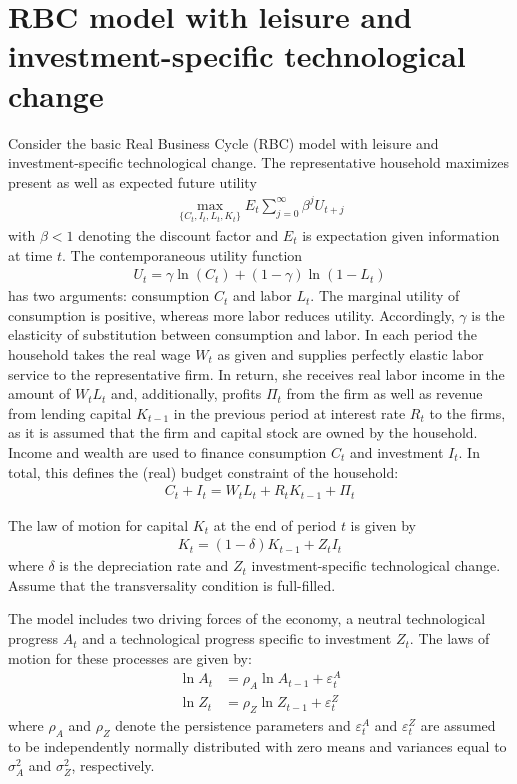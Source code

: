 \documentclass[a4paper]{scrartcl}
\begin{document}
\section{RBC model with leisure and investment-specific technological change}
Consider the basic Real Business Cycle (RBC) model with leisure and investment-specific technological change. The representative household maximizes present as well as expected future utility
\begin{align*}
\underset{\{C_{t},I_{t},L_t,K_{t}\}}{\max} E_t \sum_{j=0}^{\infty} \beta^{j} U_{t+j}
\end{align*}
with $\beta <1$ denoting the discount factor and $E_t$ is expectation given information at time $t$. The contemporaneous utility function 
\begin{align*}
U_t = \gamma \ln(C_t) + (1-\gamma) \ln{(1-L_t)}
\end{align*}
has two arguments: consumption $C_t$ and labor $L_t$. The marginal utility of consumption is positive, whereas more labor reduces utility. Accordingly, $\gamma$ is the elasticity of substitution between consumption and labor. In each period the household takes the real wage $W_t$ as given and supplies perfectly elastic labor service to the representative firm. In return, she receives real labor income in the amount of $W_t L_t$ and, additionally, profits $\Pi_t$ from the firm as well as revenue from lending capital $K_{t-1}$ in the previous period at interest rate $R_t$ to the firms, as it is assumed that the firm and capital stock are owned by the household. Income and wealth are used to finance consumption $C_t$ and investment $I_t$. In total, this defines the (real) budget constraint of the household:
\begin{align*}
C_t + I_t = W_t L_t + R_t K_{t-1} + \Pi_t
\end{align*}

The law of motion for capital $K_t$ at the end of period $t$ is given by
\begin{align*}
K_{t} = (1-\delta)K_{t-1} + Z_t I_t
\end{align*}
where $\delta$ is the depreciation rate and $Z_t$ investment-specific technological change. Assume that the transversality condition is full-filled.

The model includes two driving forces of the economy, a neutral technological progress $A_t$ and a technological progress specific to investment $Z_t$. The laws of motion for these processes are given by:
\begin{align*}
\ln{A_{t}} &= \rho_A \ln{A_{t-1}}  + \varepsilon_t^A\\
\ln{Z_{t}} &= \rho_Z \ln{Z_{t-1}}  + \varepsilon_t^Z
\end{align*}
where $\rho_A$ and $\rho_Z$ denote the persistence parameters and $\varepsilon_t^A$ and $\varepsilon_t^Z$ are assumed to be independently normally distributed with zero means and variances equal to $\sigma_A^2$ and $\sigma_Z^2$, respectively.
\end{document}
